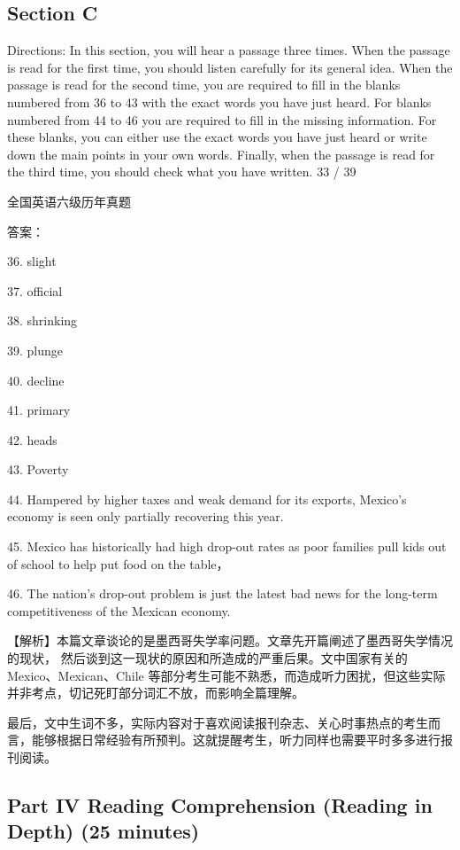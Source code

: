 \documentclass[UTF8,11pt]{ctexart}
\begin{document}
\subsection*{\textbf{Section C}}


Directions: In this section, you will hear a passage three times. When the passage is read for the first time, you should listen carefully for its general idea. When the passage is read for the second time, you are required to fill in the blanks numbered from 36 to 43 with the exact words you have just heard. For blanks numbered from 44 to 46 you are required to fill in the missing information. For these blanks, you can either use the exact words you have just heard or write down the main points in your own words. Finally, when the passage is read for the third time, you should check what you have written. 33 / 39


全国英语六级历年真题


答案：


36. slight


37. official


38. shrinking


39. plunge


40. decline


41. primary


42. heads


43. Poverty


44. Hampered by higher taxes and weak demand for its exports, Mexico's economy is seen only partially recovering this year.


45. Mexico has historically had high drop-out rates as poor families pull kids out of school to help put food on the table，


46. The nation's drop-out problem is just the latest bad news for the long-term competitiveness of the Mexican economy.


【解析】本篇文章谈论的是墨西哥失学率问题。文章先开篇阐述了墨西哥失学情况的现状， 然后谈到这一现状的原因和所造成的严重后果。文中国家有关的Mexico、Mexican、Chile 等部分考生可能不熟悉，而造成听力困扰，但这些实际并非考点，切记死盯部分词汇不放，而影响全篇理解。


最后，文中生词不多，实际内容对于喜欢阅读报刊杂志、关心时事热点的考生而言，能够根据日常经验有所预判。这就提醒考生，听力同样也需要平时多多进行报刊阅读。


\subsection*{\textbf{Part IV} \textbf{Reading Comprehension (Reading in Depth)} \textbf{(25 minutes)}}
\end{document}
